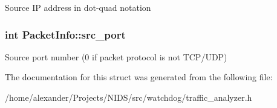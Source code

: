 Source I\-P address in dot-\/quad notation \hypertarget{structPacketInfo_a668e7df495d0a55fc1c8f67da13d80a3}{
\subsubsection[{src\-\_\-port}]{\setlength{\rightskip}{0pt plus 5cm}int Packet\-Info\-::src\-\_\-port}}\label{structPacketInfo_a668e7df495d0a55fc1c8f67da13d80a3}
Source port number (0 if packet protocol is not T\-C\-P/\-U\-D\-P) 

The documentation for this struct was generated from the following file\-:\begin{DoxyCompactItemize}
\item 
/home/alexander/\-Projects/\-N\-I\-D\-S/src/watchdog/traffic\-\_\-analyzer.\-h\end{DoxyCompactItemize}
